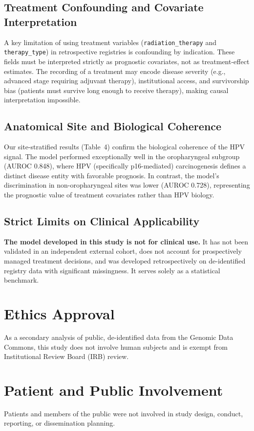 \documentclass[11pt]{article}
\begin{document}
\subsection{Treatment Confounding and Covariate Interpretation}
A key limitation of using treatment variables (\texttt{radiation\_therapy} and \texttt{therapy\_type}) in retrospective registries is confounding by indication. These fields must be interpreted strictly as prognostic covariates, not as treatment-effect estimates. The recording of a treatment may encode disease severity (e.g., advanced stage requiring adjuvant therapy), institutional access, and survivorship bias (patients must survive long enough to receive therapy), making causal interpretation impossible.

\subsection{Anatomical Site and Biological Coherence}
Our site-stratified results (Table~4) confirm the biological coherence of the HPV signal. The model performed exceptionally well in the oropharyngeal subgroup (AUROC 0.848), where HPV (specifically p16-mediated) carcinogenesis defines a distinct disease entity with favorable prognosis. In contrast, the model's discrimination in non-oropharyngeal sites was lower (AUROC 0.728), representing the prognostic value of treatment covariates rather than HPV biology.

\subsection{Strict Limits on Clinical Applicability}
\textbf{The model developed in this study is not for clinical use.} It has not been validated in an independent external cohort, does not account for prospectively managed treatment decisions, and was developed retrospectively on de-identified registry data with significant missingness. It serves solely as a statistical benchmark.

\section*{Ethics Approval}
As a secondary analysis of public, de-identified data from the Genomic Data Commons, this study does not involve human subjects and is exempt from Institutional Review Board (IRB) review.

\section*{Patient and Public Involvement}
Patients and members of the public were not involved in study design, conduct, reporting, or dissemination planning.
\end{document}
